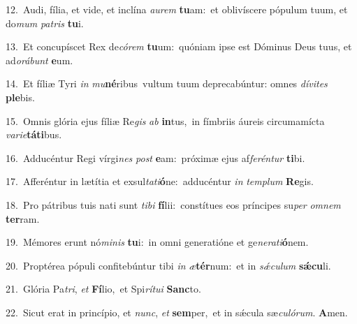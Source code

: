 {\numbfont\textcolor{\numbcolor}{12.}}~Audi, fília, et vide, et inclína \textit{au}\-\textit{rem} \textbf{tu}\-am:~\star et oblivíscere pópulum tuum, et do\textit{mum} \textit{pa}\-\textit{tris} \textbf{tu}\-i.\par
{\numbfont\textcolor{\numbcolor}{13.}}~Et concupíscet Rex de\-\textit{có}\-\textit{rem} \textbf{tu}\-um:~\star quóniam ipse est Dóminus Deus tuus, et ad\-\textit{o}\-\textit{rá}\textit{bunt} \textbf{e}\-um.\par
{\numbfont\textcolor{\numbcolor}{14.}}~Et fíliæ Tyri \textit{in} \textit{mu}\-\textbf{né}ribus~\star vultum tuum deprecabúntur: omnes \textit{dí}\-\textit{vi}\textit{tes} \textbf{ple}\-bis.\par
{\numbfont\textcolor{\numbcolor}{15.}}~Omnis glória ejus fíliæ Re\textit{gis} \textit{ab} \textbf{in}\-tus,~\star in fímbriis áureis circumamícta \textit{va}\-\textit{ri}\textit{e}\textbf{tá}\textbf{ti}bus.\par
{\numbfont\textcolor{\numbcolor}{16.}}~Adducéntur Regi vírgi\textit{nes} \textit{post} \textbf{e}\-am:~\star próximæ ejus af\-\textit{fe}\-\textit{rén}\textit{tur} \textbf{ti}\-bi.\par
{\numbfont\textcolor{\numbcolor}{17.}}~Afferéntur in lætítia et exsul\-\textit{ta}\-\textit{ti}\textbf{ó}ne:~\star adducéntur \textit{in} \textit{tem}\-\textit{plum} \textbf{Re}\-gis.\par
{\numbfont\textcolor{\numbcolor}{18.}}~Pro pátribus tuis nati sunt \textit{ti}\-\textit{bi} \textbf{fí}\-lii:~\star constítues eos príncipes su\textit{per} \textit{om}\-\textit{nem} \textbf{ter}\-ram.\par
{\numbfont\textcolor{\numbcolor}{19.}}~Mémores erunt nó\-\textit{mi}\-\textit{nis} \textbf{tu}\-i:~\star in omni generatióne et ge\-\textit{ne}\-\textit{ra}\textit{ti}\textbf{ó}nem.\par
{\numbfont\textcolor{\numbcolor}{20.}}~Proptérea pópuli confitebúntur tibi \textit{in} \textit{æ}\-\textbf{tér}num:~\star et in \textit{sǽ}\-\textit{cu}\textit{lum} \textbf{sǽ}\-\textbf{cu}li.\par
{\numbfont\textcolor{\numbcolor}{21.}}~Glória Pa\-\textit{tri}\-, \textit{et} \textbf{Fí}\-lio,~\star et Spi\-\textit{rí}\-\textit{tu}\textit{i} \textbf{Sanc}\-to.\par
{\numbfont\textcolor{\numbcolor}{22.}}~Sicut erat in princípio, et \textit{nunc}\-, \textit{et} \textbf{sem}\-per,~\star et in sǽcula sæ\-\textit{cu}\-\textit{ló}\textit{rum}. \textbf{A}\-men.\par
